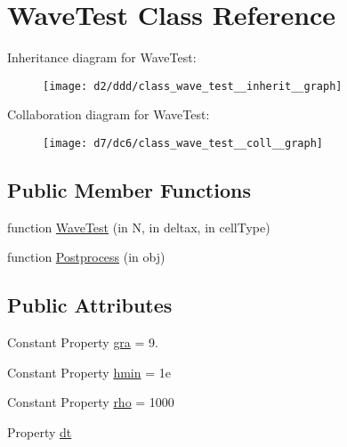 \hypertarget{class_wave_test}{}\section{Wave\+Test Class Reference}
\label{class_wave_test}


Inheritance diagram for Wave\+Test\+:
\nopagebreak
\begin{figure}[H]
\begin{center}
\leavevmode
\texttt{[image: d2/ddd/class\_wave\_test\_\_inherit\_\_graph]}
\end{center}
\end{figure}


Collaboration diagram for Wave\+Test\+:
\nopagebreak
\begin{figure}[H]
\begin{center}
\leavevmode
\texttt{[image: d7/dc6/class\_wave\_test\_\_coll\_\_graph]}
\end{center}
\end{figure}
\subsection*{Public Member Functions}
\begin{DoxyCompactItemize}
\item 
function \hyperlink{class_wave_test_ab83741f132601b6616d0f5ebcef95864}{Wave\+Test} (in N, in deltax, in cell\+Type)
\item 
function \hyperlink{class_wave_test_ac395bf70483876e3fa90a0fea2e82753}{Postprocess} (in obj)
\end{DoxyCompactItemize}
\subsection*{Public Attributes}
\begin{DoxyCompactItemize}
\item 
Constant Property \hyperlink{class_wave_test_a84df5d65dd2e17a8039848dc1ec6d66b}{gra} = 9.
\item 
Constant Property \hyperlink{class_wave_test_ac1a5b7805d5cc7ec6f62621d845ea48b}{hmin} = 1e
\item 
Constant Property \hyperlink{class_wave_test_a01703cd871430df0750a55c9acf72015}{rho} = 1000
\item 
Property \hyperlink{class_wave_test_a3d99fb45d9f2db1755646cb86bc681a4}{dt}
\end{DoxyCompactItemize}
